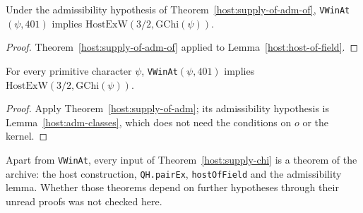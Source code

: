 \begin{theorem}[supply]\label{host:supply-of-adm}
Under the admissibility hypothesis of Theorem~\ref{host:supply-of-adm-of},
\texttt{VWinAt}$(\psi,401)$ implies $\mathrm{HostExW}(3/2,\mathrm{GChi}(\psi))$.
\end{theorem}
\begin{proof}
Theorem~\ref{host:supply-of-adm-of} applied to Lemma~\ref{host:host-of-field}.
\end{proof}

\begin{theorem}\label{host:supply-chi}
For every primitive character $\psi$, \texttt{VWinAt}$(\psi,401)$ implies
$\mathrm{HostExW}(3/2,\mathrm{GChi}(\psi))$.
\end{theorem}
\begin{proof}
Apply Theorem~\ref{host:supply-of-adm}; its admissibility hypothesis is
Lemma~\ref{host:adm-classes}, which does not need the conditions on $o$ or
the kernel.
\end{proof}

\begin{remark}\label{host:rem-supply}
Apart from \texttt{VWinAt}, every input of Theorem~\ref{host:supply-chi}
is a theorem of the archive: the host construction, \texttt{QH.pairEx},
\texttt{hostOfField} and the admissibility lemma. Whether those theorems
depend on further hypotheses through their unread proofs was not checked
here.
\end{remark}
